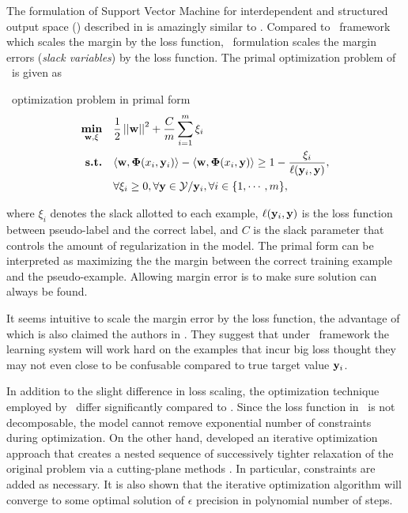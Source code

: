 {The formulation of Support Vector Machine for interdependent and structured output space (\svmstruct) described in \citep{THJA04,TJTA05} is amazingly similar to \mmmn.
Compared to \mmmn\ framework which scales the margin by the loss function, \svmstruct\ formulation scales the margin errors ({\em slack variables}) by the loss function.
The primal optimization problem of \svmstruct\ is given as
\begin{definition}{\svmstruct\ optimization problem in primal form}\label{def_svmstruct}
	\begin{align*}
		\underset{\mathbf {w},\mathbf{\xi}}{\textbf{min}} & \quad\frac{1}{2}\left|\left| \mathbf {w} \right|\right|^2 + \frac{C}{m}\sum_{i=1}^{m}\xi_i \\
		\textbf{s.t.} & \quad\langle \mathbf {w}, \mathbf{\Phi}(x_i,\mathbf {y}_i) \rangle - \langle \mathbf {w}, \mathbf{\Phi}(x_i,\mathbf {y}) \rangle \ge 1-\frac{\xi_i}{\mathbf {\ell}(\mathbf {y}_i,\mathbf {y})},\\
		& \quad \forall \xi_i\ge0, \forall \mathbf {y}\in\mathcal{Y}/\mathbf {y}_i, \forall i\in\{1,\cdots,m\},
	\end{align*}
\end{definition}
where $\xi_i$ denotes the slack allotted to each example, $\mathbf {\ell}(\mathbf {y}_i,\mathbf {y})$ is the loss function between pseudo-label and the correct label, and $C$ is the slack parameter that controls the amount of regularization in the model.
The primal form can be interpreted as maximizing the the margin between the correct training example and the pseudo-example.
Allowing margin error is to make sure solution can always be found.

It seems intuitive to scale the margin error by the loss function, the advantage of which is also claimed the authors in \citep[p.3]{THJA04}.
They suggest that under \mmmn\ framework the learning system will work hard on the examples that incur big loss thought they may not even close to be confusable compared to true target value $\mathbf {y}_i$.

In addition to the slight difference in loss scaling, the optimization technique employed by \svmstruct\ differ significantly compared to \mmmn.
Since the loss function in \svmstruct\ is not decomposable, the model cannot remove exponential number of constraints during optimization.
On the other hand, \citet{THJA04} developed an iterative optimization approach that creates a nested sequence of successively tighter relaxation of the original problem via a cutting-plane methods \citep{Bishop07,JFY09}.
In particular, constraints are added as necessary.
It is also shown that the iterative optimization algorithm will converge to some optimal solution of $\epsilon$ precision in polynomial number of steps.

}
